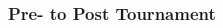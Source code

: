 \begin{CJK}{UTF8}{gbsn}
       \subsubsection{Pre- to Post Tournament\label{app8:MLM21b}}

       






\end{CJK}
